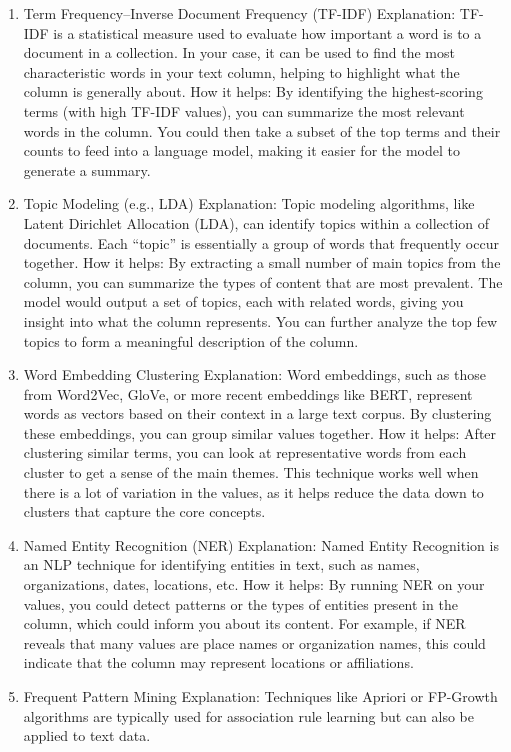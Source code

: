 \begin{enumerate}
\item Term Frequency–Inverse Document Frequency (TF-IDF)
Explanation: TF-IDF is a statistical measure used to evaluate how important a word is to a document in a collection. In your case, it can be used to find the most characteristic words in your text column, helping to highlight what the column is generally about.
How it helps: By identifying the highest-scoring terms (with high TF-IDF values), you can summarize the most relevant words in the column. You could then take a subset of the top terms and their counts to feed into a language model, making it easier for the model to generate a summary.
\item Topic Modeling (e.g., LDA)
Explanation: Topic modeling algorithms, like Latent Dirichlet Allocation (LDA), can identify topics within a collection of documents. Each “topic” is essentially a group of words that frequently occur together.
How it helps: By extracting a small number of main topics from the column, you can summarize the types of content that are most prevalent. The model would output a set of topics, each with related words, giving you insight into what the column represents. You can further analyze the top few topics to form a meaningful description of the column.
\item Word Embedding Clustering
Explanation: Word embeddings, such as those from Word2Vec, GloVe, or more recent embeddings like BERT, represent words as vectors based on their context in a large text corpus. By clustering these embeddings, you can group similar values together.
How it helps: After clustering similar terms, you can look at representative words from each cluster to get a sense of the main themes. This technique works well when there is a lot of variation in the values, as it helps reduce the data down to clusters that capture the core concepts.
\item Named Entity Recognition (NER)
Explanation: Named Entity Recognition is an NLP technique for identifying entities in text, such as names, organizations, dates, locations, etc.
How it helps: By running NER on your values, you could detect patterns or the types of entities present in the column, which could inform you about its content. For example, if NER reveals that many values are place names or organization names, this could indicate that the column may represent locations or affiliations.
\item Frequent Pattern Mining
Explanation: Techniques like Apriori or FP-Growth algorithms are typically used for association rule learning but can also be applied to text data.

\end{enumerate}

